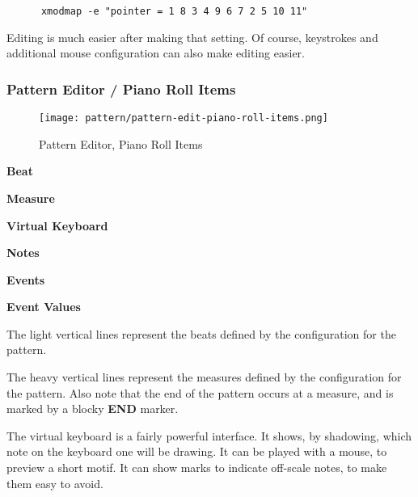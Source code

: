    \begin{verbatim}
      xmodmap -e "pointer = 1 8 3 4 9 6 7 2 5 10 11"
   \end{verbatim}

   Editing is much easier after making that setting.   Of course, keystrokes
   and additional mouse configuration can also make editing easier.

\subsubsection{Pattern Editor / Piano Roll Items}
\label{subsubsec:seq64_pattern_editor_piano_roll_items}

\begin{figure}[H]
   \centering 
   \texttt{[image: pattern/pattern-edit-piano-roll-items.png]}
   \caption{Pattern Editor, Piano Roll Items}
   \label{fig:pattern_editor_piano_roll_items}
\end{figure}

   \begin{enumber}
      \item \textbf{Beat}
      \item \textbf{Measure}
      \item \textbf{Virtual Keyboard}
      \item \textbf{Notes}
      \item \textbf{Events}
      \item \textbf{Event Values}
   \end{enumber}

   \setcounter{ItemCounter}{0}      %

   The light vertical lines represent the beats defined by the configuration
   for the pattern.

   The heavy vertical lines represent the measures defined by the
   configuration for the pattern.
   Also note that the end of the pattern
   occurs at a measure, and is marked by a blocky \textbf{END} marker.

   The virtual keyboard is a fairly powerful interface.  It shows,
   by shadowing, which note on the keyboard one will be drawing. It can be
   played with a mouse, to preview a short motif.
   It can show marks to indicate off-scale notes, to make them easy to
   avoid.

